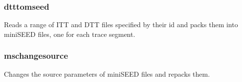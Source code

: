 \documentclass[a4paper]{article}
\begin{document}
\begin{multicols}{2}
  \subsubsection{dtttomseed} Reads a range of ITT and DTT files
  specified by their id and packs them into miniSEED files, one for each
  trace segment.

  \subsubsection{mschangesource} Changes the source parameters of
  miniSEED files and repacks them.

\vspace{5em}
\printbibliography
\end{multicols}
\end{document}

